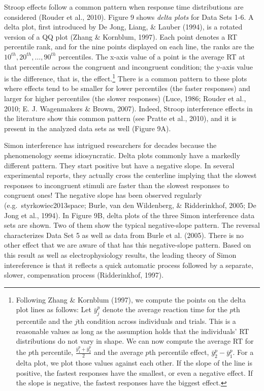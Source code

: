 \documentclass[american,man]{apa6}
\begin{document}
Stroop effects follow a common pattern when response time distributions
are considered (Rouder et al., 2010). Figure 9 shows \emph{delta plots}
for Data Sets 1-6. A delta plot, first introduced by {De Jong}, Liang,
\& Lauber (1994), is a rotated version of a QQ plot (Zhang \& Kornblum,
1997). Each point denotes a RT percentile rank, and for the nine points
displayed on each line, the ranks are the
\(10^{th},20^{th},\ldots,90^{th}\) percentiles. The x-axis value of a
point is the average RT at that percentile across the congruent and
incongruent condition; the y-axis value is the difference, that is, the
effect.\footnote{Following Zhang \& Kornblum (1997), we compute the
  points on the delta plot lines as follows: Let \(\bar{y}^p_j\) denote
  the average reaction time for the \(p\)th percentile and the \(j\)th
  condition across individuals and trials. This is a reasonable values
  as long as the assumption holds that the individuals' RT distributions
  do not vary in shape. We can now compute the average RT for the
  \(p\)th percentile, \(\frac{\bar{y}^p_1 + \bar{y}^p_2}{2}\) and the
  average \(p\)th percentile effect, \(\bar{y}^p_2 - \bar{y}^p_1\). For
  a delta plot, we plot those values against each other. If the slope of
  the line is positive, the fastest responses have the smallest, or even
  a negative effect. If the slope is negative, the fastest responses
  have the biggest effect.} There is a common pattern to these plots
where effects tend to be smaller for lower percentiles (the faster
responses) and larger for higher percentiles (the slower responses)
(Luce, 1986; Rouder et al., 2010; E. J. Wagenmakers \& Brown, 2007).
Indeed, Stroop interference effects in the literature show this common
pattern (see Pratte et al., 2010), and it is present in the analyzed
data sets as well (Figure 9A).

Simon interference has intrigued researchers for decades because the
phenomenology seems idiosyncratic. Delta plots commonly have a markedly
different pattern. They start positive but have a negative slope. In
several experimental reports, they actually cross the centerline
implying that the slowest responses to incongruent stimuli are faster
than the slowest responses to congruent ones! The negative slope has
been observed regularly (e.g.~styrkowiec2013space; Burle, {van den
Wildenberg}, \& Ridderinkhof, 2005; {De Jong} et al., 1994). In Figure
9B, delta plots of the three Simon interference data sets are shown. Two
of them show the typical negative-slope pattern. The reversal
characterizes Data Set 5 as well as data from Burle et al. (2005). There
is no other effect that we are aware of that has this negative-slope
pattern. Based on this result as well as electrophysiology results, the
leading theory of Simon intereference is that it reflects a quick
automatic process followed by a separate, slower, compensation process
(Ridderinkhof, 1997).
\end{document}
